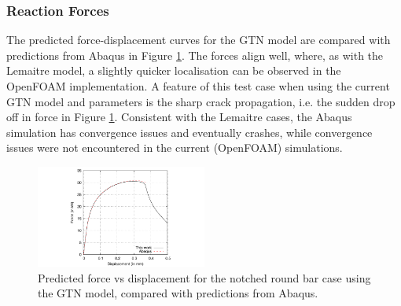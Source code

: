 \documentclass[sn-mathphys,Numbered]{sn-jnl}%
\begin{document}

\subsubsection{Reaction Forces}
The predicted force-displacement curves for the GTN model are compared with predictions from Abaqus in Figure \ref{fig:axi_GTN_forceDisp}.
The forces align well, where, as with the Lemaitre model, a slightly quicker localisation can be observed in the OpenFOAM implementation.
A feature of this test case when using the current GTN model and parameters is the sharp crack propagation, i.e. the sudden drop off in force in Figure \ref{fig:axi_GTN_forceDisp}.
Consistent with the Lemaitre cases, the Abaqus simulation has convergence issues and eventually crashes, while convergence issues were not encountered in the current (OpenFOAM) simulations.
\begin{figure}[htb]
\begin{center}
	\includegraphics[width=0.5\textwidth]{./Figures/GTNCompare/forceDispGTN2}
	\caption{Predicted force vs displacement for the notched round bar case using the GTN model, compared with predictions from Abaqus.}
	\label{fig:axi_GTN_forceDisp}
\end{center}
\end{figure}

\end{document}

